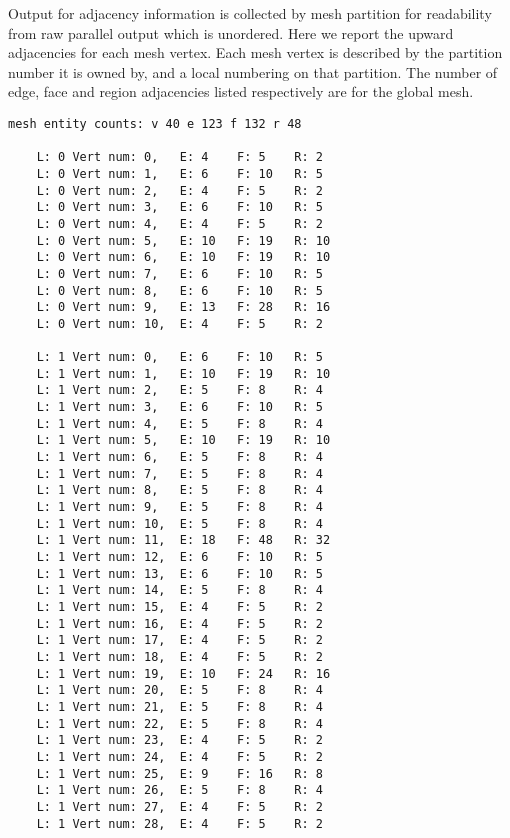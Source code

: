 \documentclass{article}
\begin{document}
Output for adjacency information is collected by mesh partition for readability from raw parallel output which is unordered. Here we report the upward adjacencies for each mesh vertex. Each mesh vertex is described by the partition number it is owned by, and a local numbering on that partition. The number of edge, face and region adjacencies listed respectively are for the global mesh.
\pagebreak
\begin{lstlisting}[frame = single]
    mesh entity counts: v 40 e 123 f 132 r 48

    L: 0 Vert num: 0,   E: 4    F: 5    R: 2
    L: 0 Vert num: 1,   E: 6    F: 10   R: 5
    L: 0 Vert num: 2,   E: 4    F: 5    R: 2
    L: 0 Vert num: 3,   E: 6    F: 10   R: 5
    L: 0 Vert num: 4,   E: 4    F: 5    R: 2
    L: 0 Vert num: 5,   E: 10   F: 19   R: 10
    L: 0 Vert num: 6,   E: 10   F: 19   R: 10
    L: 0 Vert num: 7,   E: 6    F: 10   R: 5
    L: 0 Vert num: 8,   E: 6    F: 10   R: 5
    L: 0 Vert num: 9,   E: 13   F: 28   R: 16
    L: 0 Vert num: 10,  E: 4    F: 5    R: 2

    L: 1 Vert num: 0,   E: 6    F: 10   R: 5
    L: 1 Vert num: 1,   E: 10   F: 19   R: 10
    L: 1 Vert num: 2,   E: 5    F: 8    R: 4
    L: 1 Vert num: 3,   E: 6    F: 10   R: 5
    L: 1 Vert num: 4,   E: 5    F: 8    R: 4
    L: 1 Vert num: 5,   E: 10   F: 19   R: 10
    L: 1 Vert num: 6,   E: 5    F: 8    R: 4
    L: 1 Vert num: 7,   E: 5    F: 8    R: 4
    L: 1 Vert num: 8,   E: 5    F: 8    R: 4
    L: 1 Vert num: 9,   E: 5    F: 8    R: 4
    L: 1 Vert num: 10,  E: 5    F: 8    R: 4
    L: 1 Vert num: 11,  E: 18   F: 48   R: 32
    L: 1 Vert num: 12,  E: 6    F: 10   R: 5
    L: 1 Vert num: 13,  E: 6    F: 10   R: 5
    L: 1 Vert num: 14,  E: 5    F: 8    R: 4
    L: 1 Vert num: 15,  E: 4    F: 5    R: 2
    L: 1 Vert num: 16,  E: 4    F: 5    R: 2
    L: 1 Vert num: 17,  E: 4    F: 5    R: 2
    L: 1 Vert num: 18,  E: 4    F: 5    R: 2
    L: 1 Vert num: 19,  E: 10   F: 24   R: 16
    L: 1 Vert num: 20,  E: 5    F: 8    R: 4
    L: 1 Vert num: 21,  E: 5    F: 8    R: 4
    L: 1 Vert num: 22,  E: 5    F: 8    R: 4
    L: 1 Vert num: 23,  E: 4    F: 5    R: 2
    L: 1 Vert num: 24,  E: 4    F: 5    R: 2
    L: 1 Vert num: 25,  E: 9    F: 16   R: 8
    L: 1 Vert num: 26,  E: 5    F: 8    R: 4
    L: 1 Vert num: 27,  E: 4    F: 5    R: 2
    L: 1 Vert num: 28,  E: 4    F: 5    R: 2
\end{lstlisting}
\end{document}
